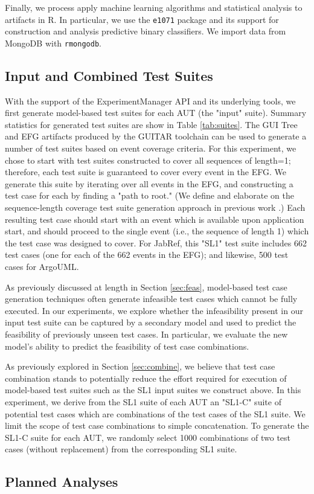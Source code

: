 Finally, we process apply machine learning algorithms and statistical analysis to artifacts in R. In particular, we use the \texttt{e1071} package
and its support for construction and analysis predictive binary classifiers. We import data from MongoDB with \texttt{rmongodb}.

\subsection{Input and Combined Test Suites}

With the support of the ExperimentManager API and its underlying tools, we first generate model-based
test suites for each AUT (the "input" suite). Summary statistics for generated test suites are show in Table
\ref{tab:suites}. The GUI Tree and EFG artifacts produced by the GUITAR toolchain
can be used to generate a number of test suites based on event coverage criteria. For this experiment,
we chose to start with test
suites constructed to cover all sequences of length=1; therefore, each test suite is guaranteed to cover every event in
the EFG. We generate this suite by iterating over all events in the EFG, and constructing a test case for each
by finding a "path to root." (We define and elaborate on the sequence-length coverage test suite generation approach
in previous work \cite{YYY, ZZZ, AAA}.)
Each resulting test case should start with an event which is available upon application start,
and should proceed to the single event (i.e., the sequence of length 1) which the test case was designed to cover.
For JabRef, this "SL1" test suite includes 662 test cases (one for each of the 662 events in the EFG); and likewise,
500 test cases for ArgoUML.

As previously discussed at length in Section \ref{sec:feas}, model-based test case generation techniques often
generate infeasible test cases which cannot be fully executed. In our experiments, we explore whether the infeasibility
present in our input test suite can be captured by a secondary model and used to predict the feasibility of previously
unseen test cases. In particular, we evaluate the new model's ability to predict the feasibility of test case combinations.

As previously explored in Section \ref{sec:combine}, we believe that test case combination stands to potentially reduce the effort
required for execution of model-based test suites such as the SL1 input suites we construct above. In this experiment, we derive from
the SL1 suite of each AUT an "SL1-C" suite of potential test cases which are combinations of the test cases of the
SL1 suite. We limit the scope of test case combinations to simple concatenation. To generate the SL1-C suite for each AUT, we randomly
select 1000 combinations of two test cases (without replacement) from the corresponding SL1 suite.

\subsection{Planned Analyses}
